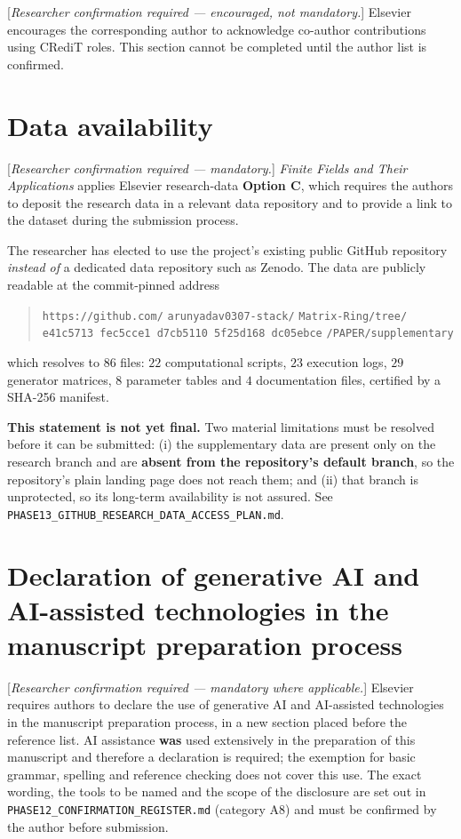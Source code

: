\documentclass[11pt,a4paper]{article}
\theoremstyle{plain}
\theoremstyle{definition}
\theoremstyle{remark}
\begin{document}
[\emph{Researcher confirmation required --- encouraged, not mandatory.}] Elsevier
encourages the corresponding author to acknowledge co-author contributions
using CRediT roles. This section cannot be completed until the author list is
confirmed.

\section*{Data availability}
\label{sec:dataavailability}

[\emph{Researcher confirmation required --- mandatory.}] \emph{Finite Fields
and Their Applications} applies Elsevier research-data \textbf{Option C},
which requires the authors to deposit the research data in a relevant data
repository and to provide a link to the dataset during the submission process.

The researcher has elected to use the project's existing public GitHub
repository \emph{instead of} a dedicated data repository such as Zenodo. The
data are publicly readable at the commit-pinned address

\begin{quote}\small\raggedright
\texttt{https://github.com/}
\texttt{arunyadav0307-stack/}
\texttt{Matrix-Ring/tree/}
\texttt{e41c5713 fec5cce1 d7cb5110 5f25d168 dc05ebce}
\texttt{/PAPER/supplementary}
\end{quote}

which resolves to $86$ files: $22$ computational scripts, $23$ execution logs,
$29$ generator matrices, $8$ parameter tables and $4$ documentation files,
certified by a SHA-256 manifest.

\textbf{This statement is not yet final.} Two material limitations must be
resolved before it can be submitted: (i) the supplementary data are present
only on the research branch and are \textbf{absent from the repository's
default branch}, so the repository's plain landing page does not reach them;
and (ii) that branch is unprotected, so its long-term availability is not
assured. See \texttt{PHASE13\_GITHUB\_RESEARCH\_DATA\_ACCESS\_PLAN.md}.

\section*{Declaration of generative AI and AI-assisted technologies in the
manuscript preparation process}
\label{sec:genai}

[\emph{Researcher confirmation required --- mandatory where applicable.}] Elsevier
requires authors to declare the use of generative AI and AI-assisted
technologies in the manuscript preparation process, in a new section placed
before the reference list. AI assistance \textbf{was} used extensively in the
preparation of this manuscript and therefore a declaration is required; the
exemption for basic grammar, spelling and reference checking does not cover
this use. The exact wording, the tools to be named and the scope of the
disclosure are set out in
\texttt{PHASE12\_CONFIRMATION\_REGISTER.md} (category A8) and must be confirmed by
the author before submission.
\end{document}

